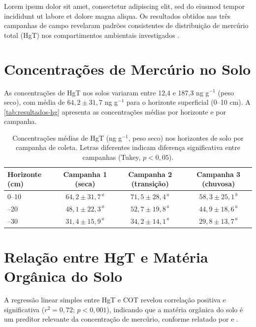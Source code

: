 
Lorem ipsum dolor sit amet, consectetur adipiscing elit, sed do eiusmod
tempor incididunt ut labore et dolore magna aliqua. Os resultados obtidos
nas três campanhas de campo revelaram padrões consistentes de distribuição
de mercúrio total (HgT) nos compartimentos ambientais investigados
\cite{exemplo:artigo:2024}.

\section{Concentrações de Mercúrio no Solo}

As concentrações de HgT nos solos variaram entre 12,4 e 187,3 ng g$^{-1}$
(peso seco), com média de $64{,}2 \pm 31{,}7$ ng g$^{-1}$ para o
horizonte superficial (0--10 cm). A \autoref{tab:resultados-hg} apresenta
as concentrações médias por horizonte e por campanha.

\begin{table}[H]
  \centering
  \caption{Concentrações médias de HgT (ng g$^{-1}$, peso seco) nos
           horizontes de solo por campanha de coleta.
           Letras diferentes indicam diferença significativa entre
           campanhas (Tukey, $p < 0{,}05$).}
  \label{tab:resultados-hg}
  \begin{tabularx}{\textwidth}{Xccc}
    \toprule
    \textbf{Horizonte (cm)}
      & \textbf{Campanha 1 (seca)}
      & \textbf{Campanha 2 (transição)}
      & \textbf{Campanha 3 (chuvosa)} \\
    \midrule
    0--10  & $64{,}2 \pm 31{,}7^{\,a}$ & $71{,}5 \pm 28{,}4^{\,a}$ & $58{,}3 \pm 25{,}1^{\,b}$ \\
    \thinrule
    10--20 & $48{,}1 \pm 22{,}3^{\,a}$ & $52{,}7 \pm 19{,}8^{\,a}$ & $44{,}9 \pm 18{,}6^{\,a}$ \\
    \thinrule
    20--30 & $31{,}4 \pm 15{,}9^{\,a}$ & $34{,}2 \pm 14{,}1^{\,a}$ & $29{,}8 \pm 13{,}7^{\,a}$ \\
    \bottomrule
  \end{tabularx}
\end{table}

\section{Relação entre HgT e Matéria Orgânica do Solo}

A regressão linear simples entre HgT e COT revelou correlação positiva
e significativa ($r^2 = 0{,}72$; $p < 0{,}001$), indicando que a matéria
orgânica do solo é um preditor relevante da concentração de mercúrio,
conforme relatado por  e
.

